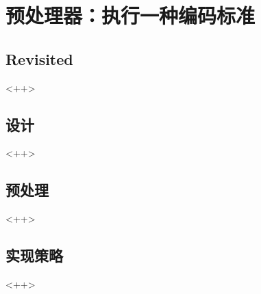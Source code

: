 

\chapter{预处理器：执行一种编码标准}

\section{ Revisited}<++>

\section{设计}<++>

\section{预处理}<++>

\section{实现策略}<++>

